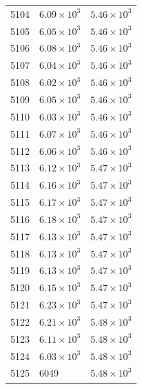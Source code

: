 \begin{table}[H]
\begin{tabular}{lll}
5104 & $\displaystyle 6.09 \times 10^{3}$ & $\displaystyle 5.46 \times 10^{3}$ \\
5105 & $\displaystyle 6.05 \times 10^{3}$ & $\displaystyle 5.46 \times 10^{3}$ \\
5106 & $\displaystyle 6.08 \times 10^{3}$ & $\displaystyle 5.46 \times 10^{3}$ \\
5107 & $\displaystyle 6.04 \times 10^{3}$ & $\displaystyle 5.46 \times 10^{3}$ \\
5108 & $\displaystyle 6.02 \times 10^{3}$ & $\displaystyle 5.46 \times 10^{3}$ \\
5109 & $\displaystyle 6.05 \times 10^{3}$ & $\displaystyle 5.46 \times 10^{3}$ \\
5110 & $\displaystyle 6.03 \times 10^{3}$ & $\displaystyle 5.46 \times 10^{3}$ \\
5111 & $\displaystyle 6.07 \times 10^{3}$ & $\displaystyle 5.46 \times 10^{3}$ \\
5112 & $\displaystyle 6.06 \times 10^{3}$ & $\displaystyle 5.46 \times 10^{3}$ \\
5113 & $\displaystyle 6.12 \times 10^{3}$ & $\displaystyle 5.47 \times 10^{3}$ \\
5114 & $\displaystyle 6.16 \times 10^{3}$ & $\displaystyle 5.47 \times 10^{3}$ \\
5115 & $\displaystyle 6.17 \times 10^{3}$ & $\displaystyle 5.47 \times 10^{3}$ \\
5116 & $\displaystyle 6.18 \times 10^{3}$ & $\displaystyle 5.47 \times 10^{3}$ \\
5117 & $\displaystyle 6.13 \times 10^{3}$ & $\displaystyle 5.47 \times 10^{3}$ \\
5118 & $\displaystyle 6.13 \times 10^{3}$ & $\displaystyle 5.47 \times 10^{3}$ \\
5119 & $\displaystyle 6.13 \times 10^{3}$ & $\displaystyle 5.47 \times 10^{3}$ \\
5120 & $\displaystyle 6.15 \times 10^{3}$ & $\displaystyle 5.47 \times 10^{3}$ \\
5121 & $\displaystyle 6.23 \times 10^{3}$ & $\displaystyle 5.47 \times 10^{3}$ \\
5122 & $\displaystyle 6.21 \times 10^{3}$ & $\displaystyle 5.48 \times 10^{3}$ \\
5123 & $\displaystyle 6.11 \times 10^{3}$ & $\displaystyle 5.48 \times 10^{3}$ \\
5124 & $\displaystyle 6.03 \times 10^{3}$ & $\displaystyle 5.48 \times 10^{3}$ \\
5125 & 6049 & $\displaystyle 5.48 \times 10^{3}$ \\

\end{tabular}
\end{table}

